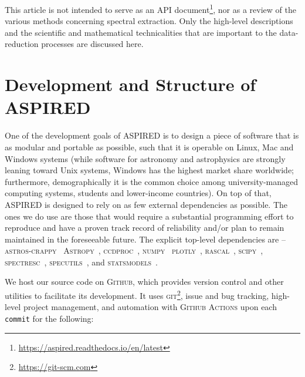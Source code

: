 \documentclass[linenumbers, twocolumn]{aastex631}
\begin{document}
This article is not intended to serve as an API document\footnote{\url{https://aspired.readthedocs.io/en/latest}\label{rtd}}, nor as a review of the
various methods concerning spectral extraction. Only the high-level
descriptions and the scientific and mathematical technicalities that are
important to the data-reduction processes are discussed here.

\section{Development and Structure of \textsc{ASPIRED}}
\label{sec:development}

One of the development goals of \textsc{ASPIRED} is to design a piece of
software that is as modular and portable as possible, such that
it is operable on Linux, Mac and Windows
systems (while software for astronomy and astrophysics are
strongly leaning toward Unix systems, Windows has the highest
market share worldwide; furthermore, demographically it is the common choice
among university-managed computing systems, students and lower-income countries).
On top of that, \textsc{ASPIRED} is designed to rely on as few external
dependencies as possible. The ones we do use are those that would require a
substantial programming effort to reproduce and have a proven track record of
reliability and/or plan to remain maintained in the foreseeable future. The
explicit top-level dependencies are --
\textsc{astros-crappy}~\citep{2001PASP..113.1420V, curtis_mccully_2018_1482019}
\textsc{Astropy}~\citep{astropy:2013, astropy:2018},
\textsc{ccdproc}~\citep{matt_craig_2017_1069648},
\textsc{numpy}~\citep{2020NumPy-Array}
\textsc{plotly}~\citep{plotly},
\textsc{rascal}~\citep{2020ASPC..527..627V},
\textsc{scipy}~\citep{2020SciPy-NMeth},
\textsc{spectresc}~\citep{2017arXiv170505165C, lam_marco_c_2023_7865549},
\textsc{specutils}~\citep{nicholas_earl_2023_7803739}, and
\textsc{statsmodels}~\citep{seabold2010statsmodels}.

We host our source code on \textsc{Github}, which provides version control
and other utilities to facilitate its development. It uses \textsc{git}\footnote{\url{https://git-scm.com}},
issue and bug tracking, high-level project management, and automation with \textsc{Github Actions} upon each \texttt{commit} for the following:
\end{document}
